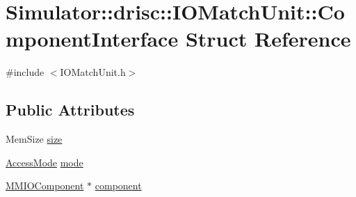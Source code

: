 \hypertarget{struct_simulator_1_1drisc_1_1_i_o_match_unit_1_1_component_interface}{\section{Simulator\+:\+:drisc\+:\+:I\+O\+Match\+Unit\+:\+:Component\+Interface Struct Reference}
\label{struct_simulator_1_1drisc_1_1_i_o_match_unit_1_1_component_interface}
}


{\ttfamily \#include $<$I\+O\+Match\+Unit.\+h$>$}

\subsection*{Public Attributes}
\begin{DoxyCompactItemize}
\item 
Mem\+Size \hyperlink{struct_simulator_1_1drisc_1_1_i_o_match_unit_1_1_component_interface_ad26de986f473ef94e97f1af27c04040e}{size}
\item 
\hyperlink{class_simulator_1_1drisc_1_1_i_o_match_unit_ab8216ac84dabbc1133fe4d26298de231}{Access\+Mode} \hyperlink{struct_simulator_1_1drisc_1_1_i_o_match_unit_1_1_component_interface_a60640fecb6402239f88a4a4a22a0b104}{mode}
\item 
\hyperlink{class_simulator_1_1drisc_1_1_m_m_i_o_component}{M\+M\+I\+O\+Component} $\ast$ \hyperlink{struct_simulator_1_1drisc_1_1_i_o_match_unit_1_1_component_interface_af41d61acc8fdc92cbf765b847c3e1458}{component}
\end{DoxyCompactItemize}


